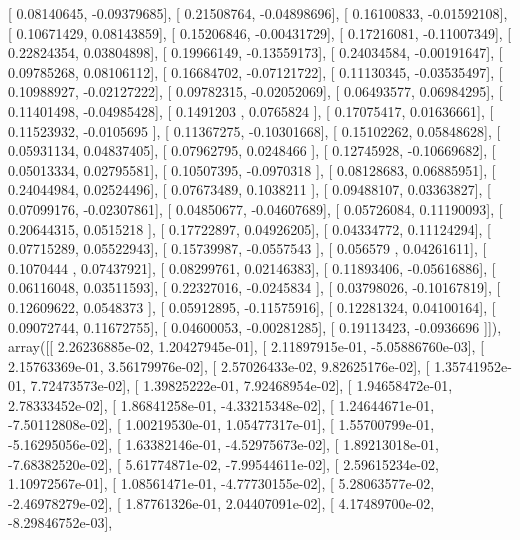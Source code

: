 \documentclass{article}
\begin{document}
       [ 0.08140645, -0.09379685],
       [ 0.21508764, -0.04898696],
       [ 0.16100833, -0.01592108],
       [ 0.10671429,  0.08143859],
       [ 0.15206846, -0.00431729],
       [ 0.17216081, -0.11007349],
       [ 0.22824354,  0.03804898],
       [ 0.19966149, -0.13559173],
       [ 0.24034584, -0.00191647],
       [ 0.09785268,  0.08106112],
       [ 0.16684702, -0.07121722],
       [ 0.11130345, -0.03535497],
       [ 0.10988927, -0.02127222],
       [ 0.09782315, -0.02052069],
       [ 0.06493577,  0.06984295],
       [ 0.11401498, -0.04985428],
       [ 0.1491203 ,  0.0765824 ],
       [ 0.17075417,  0.01636661],
       [ 0.11523932, -0.0105695 ],
       [ 0.11367275, -0.10301668],
       [ 0.15102262,  0.05848628],
       [ 0.05931134,  0.04837405],
       [ 0.07962795,  0.0248466 ],
       [ 0.12745928, -0.10669682],
       [ 0.05013334,  0.02795581],
       [ 0.10507395, -0.0970318 ],
       [ 0.08128683,  0.06885951],
       [ 0.24044984,  0.02524496],
       [ 0.07673489,  0.1038211 ],
       [ 0.09488107,  0.03363827],
       [ 0.07099176, -0.02307861],
       [ 0.04850677, -0.04607689],
       [ 0.05726084,  0.11190093],
       [ 0.20644315,  0.0515218 ],
       [ 0.17722897,  0.04926205],
       [ 0.04334772,  0.11124294],
       [ 0.07715289,  0.05522943],
       [ 0.15739987, -0.0557543 ],
       [ 0.056579  ,  0.04261611],
       [ 0.1070444 ,  0.07437921],
       [ 0.08299761,  0.02146383],
       [ 0.11893406, -0.05616886],
       [ 0.06116048,  0.03511593],
       [ 0.22327016, -0.0245834 ],
       [ 0.03798026, -0.10167819],
       [ 0.12609622,  0.0548373 ],
       [ 0.05912895, -0.11575916],
       [ 0.12281324,  0.04100164],
       [ 0.09072744,  0.11672755],
       [ 0.04600053, -0.00281285],
       [ 0.19113423, -0.0936696 ]]), array([[  2.26236885e-02,   1.20427945e-01],
       [  2.11897915e-01,  -5.05886760e-03],
       [  2.15763369e-01,   3.56179976e-02],
       [  2.57026433e-02,   9.82625176e-02],
       [  1.35741952e-01,   7.72473573e-02],
       [  1.39825222e-01,   7.92468954e-02],
       [  1.94658472e-01,   2.78333452e-02],
       [  1.86841258e-01,  -4.33215348e-02],
       [  1.24644671e-01,  -7.50112808e-02],
       [  1.00219530e-01,   1.05477317e-01],
       [  1.55700799e-01,  -5.16295056e-02],
       [  1.63382146e-01,  -4.52975673e-02],
       [  1.89213018e-01,  -7.68382520e-02],
       [  5.61774871e-02,  -7.99544611e-02],
       [  2.59615234e-02,   1.10972567e-01],
       [  1.08561471e-01,  -4.77730155e-02],
       [  5.28063577e-02,  -2.46978279e-02],
       [  1.87761326e-01,   2.04407091e-02],
       [  4.17489700e-02,  -8.29846752e-03],
\end{document}
